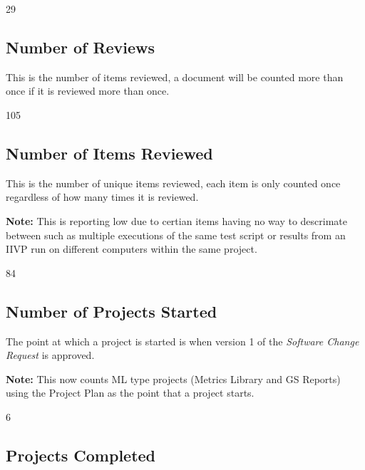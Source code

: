 \documentclass{article}
\begin{document}
\begin{Schunk}
\begin{Soutput}
[1] 29
\end{Soutput}
\end{Schunk}

\subsection{Number of Reviews}
This is the number of items reviewed, a document will be counted more than once
if it is reviewed more than once.

\begin{Schunk}
\begin{Soutput}
[1] 105
\end{Soutput}
\end{Schunk}

\subsection{Number of Items Reviewed}
This is the number of unique items reviewed, each item is only counted once
regardless of how many times it is reviewed.

\textbf{Note:} This is reporting low due to certian items having no way to
descrimate between such as multiple executions of the same test script or
results from an IIVP run on different computers within the same project.

\begin{Schunk}
\begin{Soutput}
[1] 84
\end{Soutput}
\end{Schunk}

\subsection{Number of Projects Started}
The point at which a project is started is when version 1 of the \textit{Software
Change Request} is approved.

\textbf{Note:} This now counts ML type projects (Metrics Library and GS Reports)
using the Project Plan as the point that a project starts.

\begin{Schunk}
\begin{Soutput}
[1] 6
\end{Soutput}
\end{Schunk}

\subsection{Projects Completed}
\end{document}
